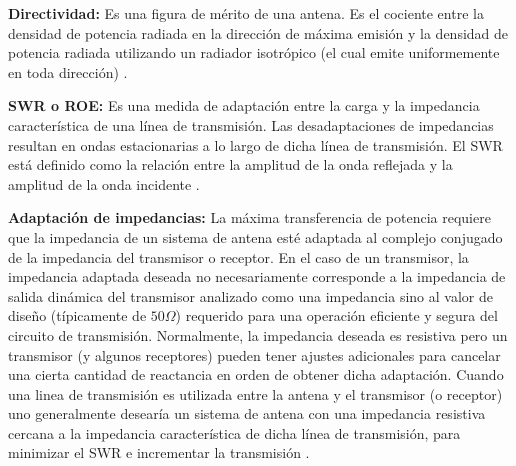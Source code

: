 {\textbf{Directividad:}} Es una figura de mérito de una antena. Es el cociente entre la densidad de potencia radiada en la
dirección de máxima emisión y la densidad de potencia radiada utilizando un radiador isotrópico (el cual emite uniformemente
en toda dirección) \cite{DirectivityWiki}.

{\textbf{SWR o ROE:}} Es una medida de adaptación entre la carga y la impedancia característica de una línea de transmisión. Las
desadaptaciones de impedancias resultan en ondas estacionarias a lo largo de dicha línea de transmisión. El SWR está
definido como la relación entre la amplitud de la onda reflejada y la amplitud de la onda incidente \cite{swrWiki}.

{\textbf{Adaptación de impedancias:}} La máxima transferencia de potencia requiere que la impedancia de un sistema de
antena esté adaptada al complejo conjugado de la impedancia del transmisor o receptor. En el caso de un transmisor,
la impedancia adaptada deseada no necesariamente corresponde a la impedancia de salida dinámica del transmisor analizado
como una impedancia sino al valor de diseño (típicamente de $50 \Omega$) requerido para una operación eficiente
y segura del circuito de transmisión. Normalmente, la impedancia deseada es resistiva pero un transmisor (y algunos receptores)
pueden tener ajustes adicionales para cancelar una cierta cantidad de reactancia en orden de obtener dicha adaptación. Cuando
una linea de transmisión es utilizada entre la antena y el transmisor (o receptor) uno generalmente desearía un sistema de antena
con una impedancia resistiva cercana a la impedancia característica de dicha línea de transmisión, para minimizar el SWR
e incrementar la transmisión \cite{AntennaWiki}.

